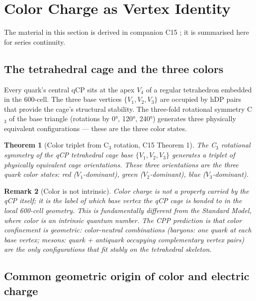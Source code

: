 \documentclass[11pt,a4paper]{article}
\newtheorem{theorem}{Theorem}[section]
\newtheorem{remark}[theorem]{Remark}
\begin{document}
\section{Color Charge as Vertex Identity}
\label{sec:color}

The material in this section is derived in companion C15
\citep{c15}; it is summarised here for series continuity.

\subsection{The tetrahedral cage and the three colors}

Every quark's central qCP sits at the apex $V_4$ of a regular
tetrahedron embedded in the 600-cell.  The three base vertices
$\{V_1, V_2, V_3\}$ are occupied by hDP pairs that provide the
cage's structural stability.  The three-fold rotational symmetry
C$_3$ of the base triangle (rotations by 0°, 120°, 240°) generates
three physically equivalent configurations --- these are the three
color states.

\begin{theorem}[Color triplet from C$_3$ rotation, C15 Theorem 1]
\label{thm:color_triplet}
The C$_3$ rotational symmetry of the qCP tetrahedral cage base
$\{V_1, V_2, V_3\}$ generates a triplet of physically equivalent
cage orientations.  These three orientations are the three quark
color states: red ($V_1$-dominant), green ($V_2$-dominant), blue
($V_3$-dominant).
\end{theorem}

\begin{remark}[Color is not intrinsic]
Color charge is not a property carried by the qCP itself; it is the
label of which base vertex the qCP cage is bonded to in the local
600-cell geometry.  This is fundamentally different from the Standard
Model, where color is an intrinsic quantum number.  The CPP
prediction is that color confinement is \emph{geometric}:
color-neutral combinations (baryons: one quark at each base vertex;
mesons: quark + antiquark occupying complementary vertex pairs) are
the only configurations that fit stably on the tetrahedral skeleton.
\end{remark}

\subsection{Common geometric origin of color and electric charge}
\end{document}
